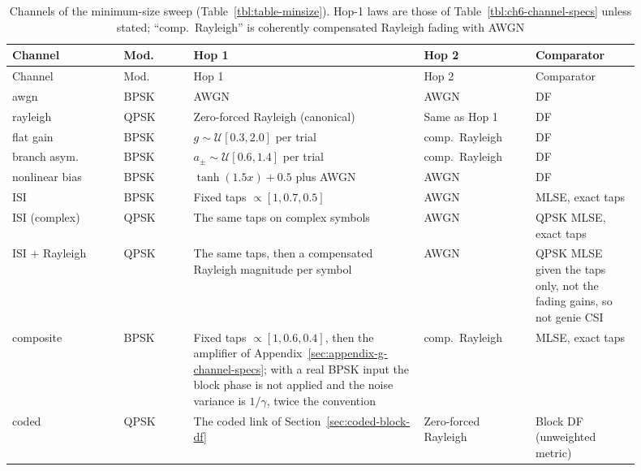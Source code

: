 {\setlength{\tabcolsep}{4pt}\begin{longtable}[]{@{}>{\raggedright\arraybackslash}p{0.16\linewidth}>{\raggedright\arraybackslash}p{0.10\linewidth}>{\raggedright\arraybackslash}p{0.33\linewidth}>{\raggedright\arraybackslash}p{0.16\linewidth}>{\raggedright\arraybackslash}p{0.15\linewidth}@{}}
\caption[Channels of the minimum-size sweep]{Channels of the minimum-size sweep (Table~\ref{tbl:table-minsize}). Hop-1 laws are those of Table~\ref{tbl:ch6-channel-specs} unless stated; ``comp.\ Rayleigh'' is coherently compensated Rayleigh fading with AWGN}\label{tbl:minsize-channels}\tabularnewline
\toprule\noalign{}
Channel & Mod. & Hop 1 & Hop 2 & Comparator \\
\midrule\noalign{}
\endfirsthead
\toprule\noalign{}
Channel & Mod. & Hop 1 & Hop 2 & Comparator \\
\midrule\noalign{}
\endhead
\bottomrule\noalign{}
\endlastfoot
awgn & BPSK & AWGN & AWGN & DF \\
rayleigh & QPSK & Zero-forced Rayleigh (canonical) & Same as Hop 1 & DF \\
flat gain & BPSK & $g\sim\mathcal{U}[0.3,2.0]$ per trial & comp.\ Rayleigh & DF \\
branch asym. & BPSK & $a_{\pm}\sim\mathcal{U}[0.6,1.4]$ per trial & comp.\ Rayleigh & DF \\
nonlinear bias & BPSK & $\tanh(1.5x)+0.5$ plus AWGN & AWGN & DF \\
ISI & BPSK & Fixed taps $\propto[1,0.7,0.5]$ & AWGN & MLSE, exact taps \\
ISI (complex) & QPSK & The same taps on complex symbols & AWGN & QPSK MLSE, exact taps \\
ISI + Rayleigh & QPSK & The same taps, then a compensated Rayleigh magnitude per symbol & AWGN & QPSK MLSE given the taps only, not the fading gains, so not genie CSI \\
composite & BPSK & Fixed taps $\propto[1,0.6,0.4]$, then the amplifier of Appendix~\ref{sec:appendix-g-channel-specs}; with a real BPSK input the block phase is not applied and the noise variance is $1/\gamma$, twice the convention & comp.\ Rayleigh & MLSE, exact taps \\
coded & QPSK & The coded link of Section~\ref{sec:coded-block-df} & Zero-forced Rayleigh & Block DF (unweighted metric) \\
\end{longtable}}

